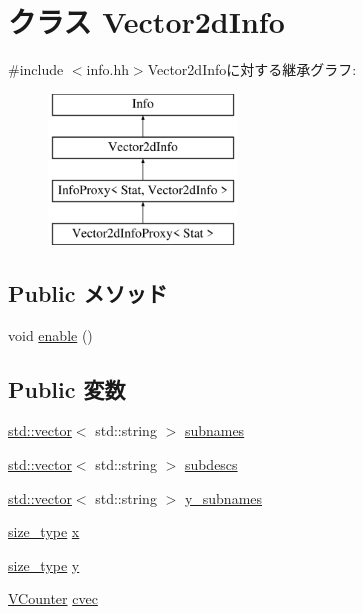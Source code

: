 \hypertarget{classStats_1_1Vector2dInfo}{
\section{クラス Vector2dInfo}
\label{classStats_1_1Vector2dInfo}
}


{\ttfamily \#include $<$info.hh$>$}Vector2dInfoに対する継承グラフ:\begin{figure}[H]
\begin{center}
\leavevmode
\includegraphics[height=4cm]{classStats_1_1Vector2dInfo}
\end{center}
\end{figure}
\subsection*{Public メソッド}
\begin{DoxyCompactItemize}
\item 
void \hyperlink{classStats_1_1Vector2dInfo_a486f22824bd83c5308a0d70ffac6f758}{enable} ()
\end{DoxyCompactItemize}
\subsection*{Public 変数}
\begin{DoxyCompactItemize}
\item 
\hyperlink{classstd_1_1vector}{std::vector}$<$ std::string $>$ \hyperlink{classStats_1_1Vector2dInfo_a3b95ca426d97cab365cc623926fdd294}{subnames}
\item 
\hyperlink{classstd_1_1vector}{std::vector}$<$ std::string $>$ \hyperlink{classStats_1_1Vector2dInfo_a722488efce925fb896e4111f77731f25}{subdescs}
\item 
\hyperlink{classstd_1_1vector}{std::vector}$<$ std::string $>$ \hyperlink{classStats_1_1Vector2dInfo_ac924820d05293e4e5e0b5de139fdede0}{y\_\-subnames}
\item 
\hyperlink{namespaceStats_ada51e68d31936547d3729c82daf6b7c6}{size\_\-type} \hyperlink{classStats_1_1Vector2dInfo_afe813128131dd3b6a82dd08a2f6786b5}{x}
\item 
\hyperlink{namespaceStats_ada51e68d31936547d3729c82daf6b7c6}{size\_\-type} \hyperlink{classStats_1_1Vector2dInfo_a1b61fe296b3ed741d2e46c445c0d0675}{y}
\item 
\hyperlink{classstd_1_1vector}{VCounter} \hyperlink{classStats_1_1Vector2dInfo_a8cc2f3a565a2e54ab797f717802bc894}{cvec}
\end{DoxyCompactItemize}


